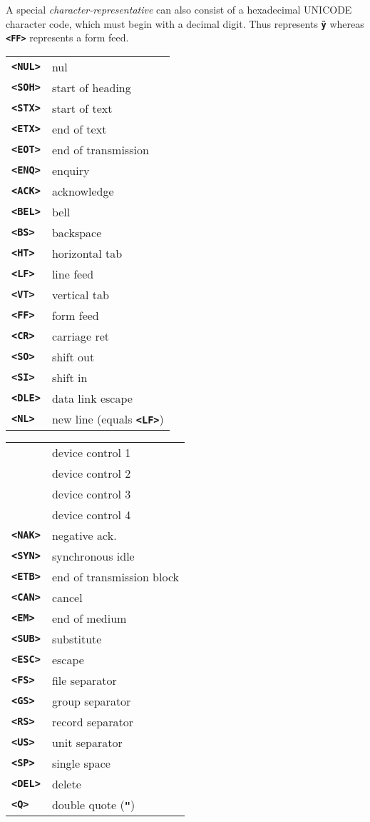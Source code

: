 \documentclass[12pt]{article}
\newcommand{\TT}[1]{{\tt \bfseries #1}}
\newcommand{\tttkey}[1]{{\tt \bfseries <#1>}}
\newlength{\figurewidth}
\newenvironment{boxedfigure}[1][!btp]%
	{\begin{figure*}[#1]
	 \begin{lrbox}{\figurebox}
	 \begin{minipage}{\figurewidth}

	 \vspace*{1ex}}%
	{
	 \vspace*{1ex}

	 \end{minipage}
	 \end{lrbox}
	 \begin{center}
	 \fbox{\hspace*{0.1in}\usebox{\figurebox}\hspace*{0.1in}}
	 \end{center}
	 \end{figure*}}
\begin{document}
A special {\em character-representative} can also consist of
a hexadecimal UNICODE character code, which must begin with a decimal digit.
Thus \TT{<0FF>} represents \TT{\"y} whereas \TT{<FF>} represents
a form feed.

\begin{boxedfigure}[!t]

\begin{center}
\begin{tabular}{lp{2in}}
\tttkey{NUL} & nul \\
\tttkey{SOH} & start of heading \\
\tttkey{STX} & start of text \\
\tttkey{ETX} & end of text \\
\tttkey{EOT} & end of transmission \\
\tttkey{ENQ} & enquiry \\
\tttkey{ACK} & acknowledge \\
\tttkey{BEL} & bell \\
\tttkey{BS}  & backspace \\
\tttkey{HT}  & horizontal tab \\
\tttkey{LF}  & line feed \\
\tttkey{VT}  & vertical tab \\
\tttkey{FF}  & form feed \\
\tttkey{CR}  & carriage ret \\
\tttkey{SO}  & shift out \\
\tttkey{SI}  & shift in \\
\tttkey{DLE} & data link escape
\\[1ex]
\tttkey{NL}  & new line (equals \TT{<LF>}) \\
\end{tabular}
\begin{tabular}{lp{2in}}
\tttkey{DC1} & device control 1 \\
\tttkey{DC2} & device control 2 \\
\tttkey{DC3} & device control 3 \\
\tttkey{DC4} & device control 4 \\
\tttkey{NAK} & negative ack. \\
\tttkey{SYN} & synchronous idle \\
\tttkey{ETB} & end of transmission block \\
\tttkey{CAN} & cancel \\
\tttkey{EM}  & end of medium \\
\tttkey{SUB} & substitute \\
\tttkey{ESC} & escape \\
\tttkey{FS}  & file separator \\
\tttkey{GS}  & group separator \\
\tttkey{RS}  & record separator \\
\tttkey{US}  & unit separator \\
\tttkey{SP}  & single space \\
\tttkey{DEL} & delete
\\[1ex]
\tttkey{Q}  & double quote (\TT{"}) \\
\end{tabular}
\end{center}


\end{boxedfigure}
\end{document}
